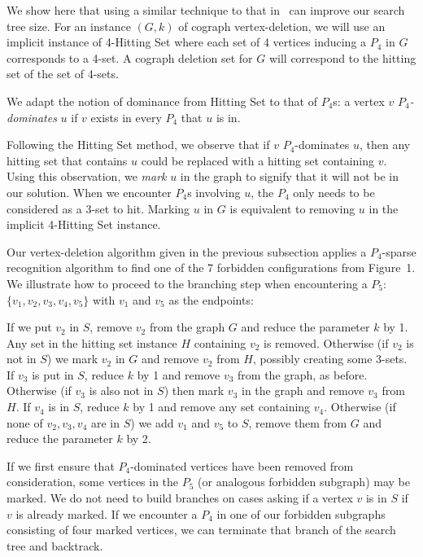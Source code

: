 \documentclass{llncs}
\begin{document}
We show here that using a similar technique to that in~\cite{NiRo} can improve our search tree size. For an instance $(G,k)$ of cograph vertex-deletion, we will use an implicit instance of 4-{\sc Hitting Set} where each set of 4 vertices inducing a $P_4$ in $G$ corresponds to a 4-set. A cograph deletion set for $G$ will correspond to the hitting set of the set of 4-sets. 

We adapt the notion of dominance from {\sc Hitting Set} to that of $P_4$s: a vertex $v$ \emph{$P_4$-dominates} $u$ if $v$ exists in every $P_4$ that $u$ is in.

Following the {\sc Hitting Set} method, we observe that if $v$ $P_4$-dominates $u$, then any hitting set that contains $u$ could be replaced with a hitting set containing $v$. Using this observation, we \emph{mark} $u$ in the graph to signify that it will not be in our solution. When we encounter $P_4$s involving $u$, the $P_4$ only needs to be considered as a 3-set to hit. Marking $u$ in $G$ is equivalent to removing $u$ in the implicit 4-{\sc Hitting Set} instance.

Our vertex-deletion algorithm given in the previous subsection applies a $P_4$-sparse recognition algorithm to find one of the 7 forbidden configurations from Figure~1. We illustrate how to proceed to the branching step when encountering a $P_5$: $\{v_1,v_2,v_3,v_4,v_5\}$ with $v_1$ and $v_5$ as the endpoints:

If we put $v_2$ in $S$, remove $v_2$ from the graph $G$ and reduce the parameter $k$ by 1. Any set in the hitting set instance $H$ containing $v_2$ is removed. Otherwise (if $v_2$ is not in $S$) we mark $v_2$ in $G$ and remove $v_2$ from $H$, possibly creating some 3-sets. If $v_3$ is put in $S$, reduce $k$ by 1 and remove $v_3$ from the graph, as before. Otherwise (if $v_3$ is also not in $S$) then mark $v_3$ in the graph and remove $v_3$ from $H$. If $v_4$ is in $S$, reduce $k$ by 1 and remove any set containing $v_4$. Otherwise (if none of $v_2, v_3, v_4$ are in $S$) we add $v_1$ and $v_5$ to $S$, remove them from $G$ and reduce the parameter $k$ by 2.

If we first ensure that $P_4$-dominated vertices have been removed from consideration, some vertices in the $P_5$ (or analogous forbidden subgraph) may be marked. We do not need to build branches on cases asking if a vertex $v$ is in $S$ if $v$ is already marked. If we encounter a $P_4$ in one of our forbidden subgraphs consisting of four marked vertices, we can terminate that branch of the search tree and backtrack.
\end{document}
